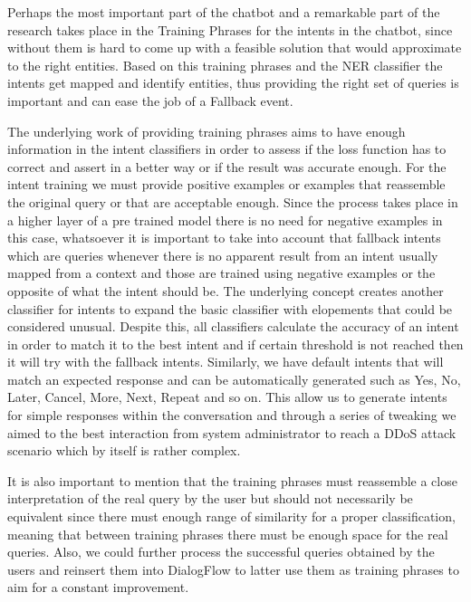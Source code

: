 Perhaps the most important part of the chatbot and a remarkable part of the research takes place in the Training Phrases for the intents in the chatbot, since without them is hard to come up with a feasible solution that would approximate to the right entities. Based on this training phrases and the NER classifier the intents get mapped and identify entities, thus providing the right set of queries is important and can ease the job of a Fallback event.

The underlying work of providing training phrases aims to have enough information in the intent classifiers in order to assess if the loss function has to correct and assert in a better way or if the result was accurate enough. For the intent training we must provide positive examples or examples that reassemble the original query or that are acceptable enough. Since the process takes place in a higher layer of a pre trained model there is no need for negative examples in this case, whatsoever it is important to take into account that fallback intents which are queries whenever there is no apparent result from an intent usually mapped from a context and those are trained using negative examples or the opposite of what the intent should be. The underlying concept creates another classifier for intents to expand the basic classifier with elopements that could be considered unusual. Despite this, all classifiers calculate the accuracy of an intent in order to match it to the best intent and if certain threshold is not reached then it will try with the fallback intents. Similarly, we have default intents that will match an expected response and can be automatically generated such as Yes, No, Later, Cancel, More, Next, Repeat and so on.  This allow us to generate intents for simple responses within the conversation and through a series of tweaking we aimed to the best interaction from system administrator to reach a DDoS attack scenario which by itself is rather complex.

It is also important to mention that the training phrases must reassemble a close interpretation of the real query by the user but should not necessarily be equivalent since there must enough range of similarity for a proper classification, meaning that between training phrases there must be enough space for the real queries. Also, we could further process the successful queries obtained by the users and reinsert them into DialogFlow to latter use them as training phrases to aim for a constant improvement.

